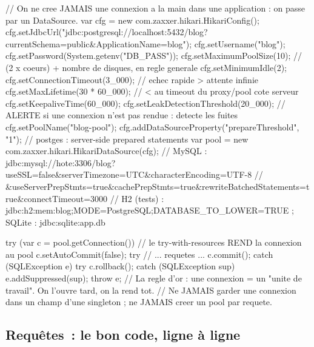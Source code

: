 \documentclass[12pt,a4paper,twoside,openright]{book}
\begin{document}
\begin{codejava}
// On ne cree JAMAIS une connexion a la main dans une application : on passe par un DataSource.
var cfg = new com.zaxxer.hikari.HikariConfig();
cfg.setJdbcUrl("jdbc:postgresql://localhost:5432/blog?currentSchema=public&ApplicationName=blog");
cfg.setUsername("blog"); cfg.setPassword(System.getenv("DB_PASS"));
cfg.setMaximumPoolSize(10);            // (2 x coeurs) + nombre de disques, en regle generale
cfg.setMinimumIdle(2);
cfg.setConnectionTimeout(3_000);        // echec rapide > attente infinie
cfg.setMaxLifetime(30 * 60_000);         // < au timeout du proxy/pool cote serveur
cfg.setKeepaliveTime(60_000);
cfg.setLeakDetectionThreshold(20_000);   // ALERTE si une connexion n'est pas rendue : detecte les fuites
cfg.setPoolName("blog-pool");
cfg.addDataSourceProperty("prepareThreshold", "1");     // postges : server-side prepared statements
var pool = new com.zaxxer.hikari.HikariDataSource(cfg);
// MySQL : jdbc:mysql://hote:3306/blog?useSSL=false&serverTimezone=UTC&characterEncoding=UTF-8
//        &useServerPrepStmts=true&cachePrepStmts=true&rewriteBatchedStatements=true&connectTimeout=3000
// H2 (tests) : jdbc:h2:mem:blog;MODE=PostgreSQL;DATABASE_TO_LOWER=TRUE ; SQLite : jdbc:sqlite:app.db

try (var c = pool.getConnection()) {                 // le try-with-resources REND la connexion au pool
    c.setAutoCommit(false);
    try {
        // ... requetes ...
        c.commit();
    } catch (SQLException e) {
        try { c.rollback(); } catch (SQLException sup) { e.addSuppressed(sup); }
        throw e;
    }
}
// La regle d'or : une connexion = un "unite de travail". On l'ouvre tard, on la rend tot.
// Ne JAMAIS garder une connexion dans un champ d'une singleton ; ne JAMAIS creer un pool par requete.
\end{codejava}

\subsection{Requ\^etes~: le bon code, ligne \`a ligne}
\end{document}
